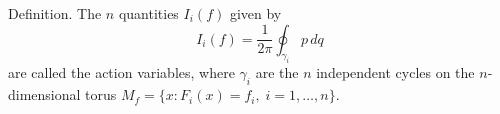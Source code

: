 Definition. The $n$ quantities $I_i(f)$ given by
$$I_i(f) = \frac{1}{2\pi} \oint_{\gamma_i} p \, dq$$
are called the action variables, where $\gamma_i$ are the $n$ independent cycles on the $n$-dimensional torus $M_f = \{x : F_i(x) = f_i,\; i=1,\ldots,n\}$.
